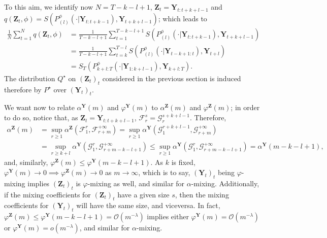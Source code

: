 \documentclass[twoside,11pt]{article}
\newcommand{\Ddobs}{\mathbf{Y}}
\newcommand{\Ddz}{\mathbf{Z}}
\newcommand{\Ddobsupkplusl}{\mathbf{Y}_{1:k+l-1}}
\newcommand{\DdobsupTfromk}{\mathbf{Y}_{k+l:T}}
\begin{document}
	To this aim, we identify now $N=T-k-l+1$, $\Ddz_t = \Ddobs_{t:t+k+l-1} $ and $ q(\Ddz_t, \phi) = S(P^\phi_{(l)}(\cdot|\Ddobs_{t:t+k-1}), \Ddobs_{t+k+l-1}) $; which  leads to
	\begin{equation}\label{}
	\begin{aligned}
	\frac{1}{N} \sum_{t=1}^N  q(\Ddz_t,\phi) &= \frac{1}{T-k-l+1} \sum_{t=1}^{T-k-l+1}  S(P^\phi_{(l)}(\cdot|\Ddobs_{t:t+k-1}),\Ddobs_{t+k+l-1}) \\
	&= \frac{1}{T-k-l+1} \sum_{t=k}^{T-l}  S(P^\phi_{(l)}(\cdot|\Ddobs_{t-k+1:t}),\Ddobs_{t+l})\\
	&=  S_T (P^\phi_{k+l:T}(\cdot|\Ddobsupkplusl), \DdobsupTfromk).
	\end{aligned}
	\end{equation}
	The distribution $ Q^\star $ on $ (\Ddz_t)_t  $ considered in the previous section is induced therefore by $ P^\star$ over $ (\Ddobs_t)_t $. 
	
	
	We want now to relate $ \alpha^\Ddobs(m) $ and $ \varphi^\Ddobs(m) $ to $ \alpha^\Ddz(m) $ and $ \varphi^\Ddz(m) $; in order to do so, notice that, as $\Ddz_t = \Ddobs_{t:t+k+l-1} $, $ \mathcal{F}_r^s= \mathcal{G}_{r}^{s+k+l-1} $. Therefore, 
	\begin{equation}\label{}
	\begin{aligned}
	\alpha^\Ddz(m) &= \sup_{r\ge 1} \alpha^\Ddz(\mathcal{F}_{1}^r,\mathcal{F}_{r+m}^{+\infty}) = \sup_{r\ge 1} \alpha^\Ddobs(\mathcal{G}_{1}^{r+k+l-1}, \mathcal{G}_{r+m}^{+\infty}) \\
	&= \sup_{r\ge k+l} \alpha^\Ddobs(\mathcal{G}_{1}^{r}, \mathcal{G}_{r+m-k-l+1}^{+\infty}) \le \sup_{r\ge 1} \alpha^\Ddobs(\mathcal{G}_{1}^{r}, \mathcal{G}_{r+m-k-l+1}^{+\infty}) = \alpha^\Ddobs(m-k-l+1),
	\end{aligned}
	\end{equation}
	and, similarly, $ \varphi^\Ddz(m)\le \varphi^\Ddobs(m-k-l+1)$. As $ k $ is fixed, $ \varphi^\Ddobs(m) \to 0 \implies  \varphi^\Ddz(m) \to 0$ as $ m\to\infty $, which is to say, $ (\Ddobs_t)_t$ being $ \varphi $-mixing implies $ (\Ddz_t)_t $ is $ \varphi $-mixing as well, and similar for $ \alpha $-mixing. Additionally, if the mixing coefficients for $ (\Ddz_t)_t $ have a given size $ s $, then the mixing coefficients for $ (\Ddobs_t)_t $ will have the same size, and viceversa. In fact, $ \varphi^\Ddz(m) \le \varphi^\Ddobs(m-k-l+1) =\mathcal{O}(m^{-\lambda}) $ implies either $ \varphi^\Ddobs(m) =\mathcal{O}(m^{-\lambda}) $ or $ \varphi^\Ddobs(m)=o(m^{-\lambda}) $, and similar for $ \alpha $-mixing.
	
\end{document}
